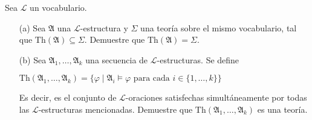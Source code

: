 Sea $\mathcal{L}$ un vocabulario.
\begin{enumerate}
	\item[(a)] Sea $\mathfrak{A}$ una $\mathcal{L}$-estructura y $\Sigma$ una teoría sobre el mismo vocabulario, tal que $\text{Th}(\mathfrak{A})\subseteq\Sigma$. Demuestre que $\text{Th}(\mathfrak{A})=\Sigma$.
	\item[(b)] Sea $\mathfrak{A}_1,\ldots,\mathfrak{A}_k$ una secuencia de $\mathcal{L}$-estructuras. Se define
	\begin{center}
		$\text{Th}(\mathfrak{A}_1,\ldots,\mathfrak{A}_k)=\{\varphi\mid\mathfrak{A}_i\models\varphi\text{ para cada }i\in\{1,\ldots,k\}\}$
	\end{center}
	Es decir, es el conjunto de $\mathcal{L}$-oraciones satisfechas simultáneamente por todas las $\mathcal{L}$-estructuras mencionadas. Demuestre que $\text{Th}(\mathfrak{A}_1,\ldots,\mathfrak{A}_k)$ es una teoría.

\end{enumerate}